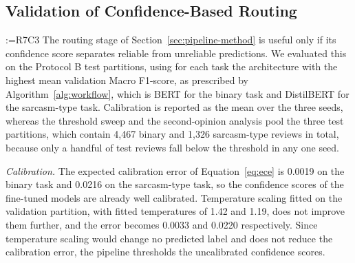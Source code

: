 \documentclass[a4paper,fleqn]{cas-sc}
\makeatletter
\newif\iftracked
\newcommand{\rv@setcolour}[1]{%
  \IfStrEq{#1}{R7C7}{\color{rvEdit}}{%
    \IfSubStr{#1}{R5}{\IfSubStr{#1}{R7}{\color{rvBoth}}{\color{rvFive}}}{\color{rvSeven}}}}
\newcommand{\rv@tag}[1]{\textsuperscript{\sffamily\bfseries\scriptsize[\StrSubstitute{#1}{,}{, }]}\,}
\newcommand{\rv@recordone}[1]{%
  \edef\rv@i{#1}%
  \ifcsdef{rv@n@\rv@i}{}{\csgdef{rv@n@\rv@i}{0}}%
  \csxdef{rv@n@\rv@i}{\the\numexpr\csuse{rv@n@\rv@i}+1\relax}%
  \begingroup\edef\@currentlabel{\rv@i}\label{rv:\rv@i:\csuse{rv@n@\rv@i}}\endgroup}
\newcommand{\rv@record}[1]{\@for\rv@id:=#1\do{\expandafter\rv@recordone\expandafter{\rv@id}}}
\DeclareRobustCommand{\rcx}[2]{\iftracked{\rv@setcolour{#1}\rv@tag{#1}#2}\else#2\fi}
\newenvironment{rcblock}[1]{\rv@record{#1}\iftracked\rv@setcolour{#1}\leavevmode\rv@tag{#1}\fi\ignorespaces}{\par}
\makeatother
\begin{document}
\subsection{\texorpdfstring{\rcx{R7C3}{Validation of Confidence-Based Routing}}{Validation of Confidence-Based Routing}}
\label{sec:routing}
\begin{rcblock}{R7C3}
The routing stage of Section~\ref{sec:pipeline-method} is useful only if its confidence score separates reliable from unreliable predictions. We evaluated this on the Protocol B test partitions, using for each task the architecture with the highest mean validation Macro F1-score, as prescribed by Algorithm~\ref{alg:workflow}, which is BERT for the binary task and DistilBERT for the sarcasm-type task. Calibration is reported as the mean over the three seeds, whereas the threshold sweep and the second-opinion analysis pool the three test partitions, which contain 4,467 binary and 1,326 sarcasm-type reviews in total, because only a handful of test reviews fall below the threshold in any one seed.

\textit{Calibration.} The expected calibration error of Equation~\eqref{eq:ece} is 0.0019 on the binary task and 0.0216 on the sarcasm-type task, so the confidence scores of the fine-tuned models are already well calibrated. Temperature scaling fitted on the validation partition, with fitted temperatures of 1.42 and 1.19, does not improve them further, and the error becomes 0.0033 and 0.0220 respectively. Since temperature scaling would change no predicted label and does not reduce the calibration error, the pipeline thresholds the uncalibrated confidence scores.


\end{rcblock}
\end{document}
